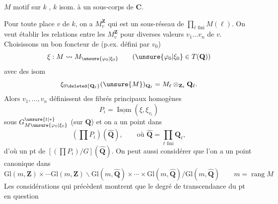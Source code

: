 $M$ motif sur $k$ , $k$ isom. à un sous-corps de $\mathbf C$.

Pour toute place $v$ de $k$, on a $M_v^{\mathbf Z}$ qui est un sous-réseau de $\prod_{\ell\text{ fini}}M(\ell)$. On veut établir les relations entre les $M_v^{\mathbf Z}$ pour diverses valeurs $v_1\ldots v_n$ de $v$. Choisissons un bon foncteur de  (p.ex. défini par $v_0$)
\[
 \xi:M\rightsquigarrow M_{\unsure{\varphi_0|\xi_0}}\qquad(\unsure{\varphi_0|\xi_0}\in T(\mathbf Q))
\]
avec des isom 
\[
 \xi_{0\deleted{\mathbf Q_\ell}}(\unsure{M})_{\mathbf Q_\ell}=M_\ell\otimes_{\mathbf Z_\ell}\mathbf Q_\ell.
\]
Alors $v_1,\ldots,v_n$ définissent des fibrés principaux homogènes
\[
 P_i=\underline{\operatorname{Isom}}(\xi,\xi_{v_i})
\]
sous $G^{\unsure{t|*}}_{M\unsure{\varphi_0|\xi_0}}$ (sur $\mathbf Q$) et on a un point dans
\[
 (\prod P_i)(\widehat{\mathbf Q}),\qquad\text{où }\widehat{\mathbf Q}=\prod_{\ell\text{ fini}}\mathbf Q_\ell,
\]
d'où un pt de $[(\prod P_i)/G](\widehat{\mathbf Q})$.
On peut aussi considérer que l'on a un point canonique dans
\[
 \mathrm{Gl}(m,\mathbf Z)\times\cdots\mathrm{Gl}(m,\mathbf Z)\backslash
 \mathrm{Gl}(m,\widehat{\mathbf Q})\times\cdots\times\mathrm{Gl}(m,\widehat{\mathbf Q})/\mathrm{Gl}(m,\widehat{\mathbf Q})
 \qquad m=\operatorname{rang}M
\]
Les considérations qui précèdent montrent que le degré de transcendance du pt en question
